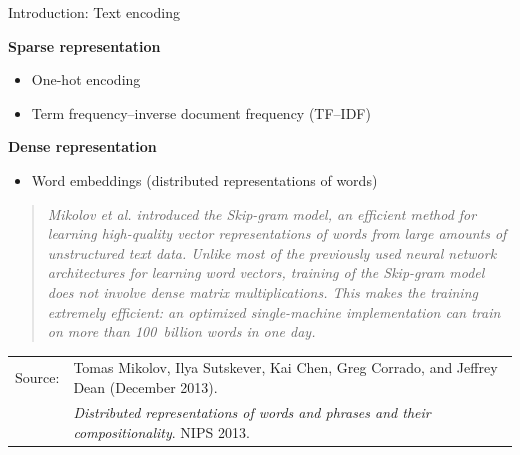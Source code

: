 \begin{frame}[t]{Introduction: Text encoding}



\small
\textbf{Sparse representation}

\vspace*{-0.4\topsep}
\begin{itemize}
\setlength{\itemsep}{0.0pt}
\item One-hot encoding
\item Term frequency--inverse document frequency (TF--IDF)
\end{itemize}

\vspace*{4mm}

\textbf{Dense representation}

\vspace*{-0.4\topsep}
\begin{itemize}
\setlength{\itemsep}{0.0pt}
\item Word embeddings (distributed representations of words)
\end{itemize}


\begingroup\setlength{\leftmargini}{14mm}%
\tiny%
\blockquote{\textit{Mikolov et al. introduced the Skip-gram model, \alert{an efficient method for learning high-quality vector representations of words from large amounts of unstructured text data}. Unlike most of the previously used neural network architectures for learning word vectors, training of the Skip-gram model does not involve dense matrix multiplications. This makes the training extremely efficient: \alert{an optimized single-machine implementation can train on more than 100~billion words in one day}.}}%

\vspace*{2mm}

\fontsize{5pt}{6pt}\selectfont%
\begin{tabular}{@{\hskip\leftmargini}l@{\hskip2pt}l}
Source: & Tomas Mikolov, Ilya Sutskever, Kai Chen, Greg Corrado, and Jeffrey Dean (December 2013).\\%
& \textit{Distributed representations of words and phrases and their compositionality}. NIPS 2013.
\end{tabular}

\endgroup


\end{frame}
